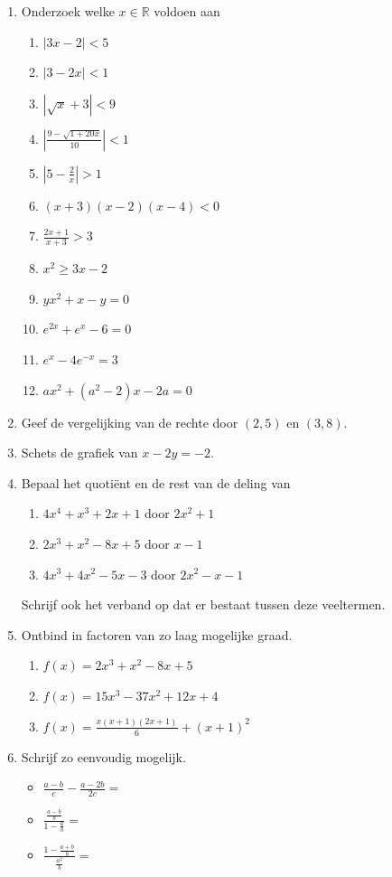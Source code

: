 \documentclass[11pt]{article}
\newcommand{\RR}{\ensuremath{\mathbb{R}}}
\newcommand{\ds}{\displaystyle}
\begin{document}
{\begin{enumerate}
\item
 Onderzoek welke $x\in \RR$ voldoen aan
 \begin{enumerate}
\item $\displaystyle |3x-2| < 5$
\item $|3-2x| < 1$
\item  $|\sqrt{x}+3|<9$
\item $\displaystyle \left|  \frac{9 - \sqrt{1+20x}}{10} \right| < 1$
\item  $\displaystyle \left|5-\frac{2}{x}\right|>1$
 
\item $(x+3)(x-2)(x-4) < 0$
\item $\ds \frac{2x+1}{x+3} > 3$
\item $\ds x^2  \geq 3x -2$
\item $y x^2 + x -y = 0$
\item $e^{2x} + e^x -6 = 0$
\item $e^x -4 e^{-x} = 3$
\item $a x^2 + (a^2 - 2) x -2 a = 0$

\end{enumerate}


\item Geef de vergelijking van de rechte door $(2,5)$ en $(3,8)$.
\item Schets de grafiek van $x-2y=-2$.

\item Bepaal het quoti\"ent en de rest van de deling van
\begin{enumerate}
\item $4x^4+x^3+2x+1$ door $2x^2+1$
\item $2 x^3 + x^2 - 8x + 5$ door $x-1$
\item $4x^3+4x^2-5x-3$ door $2x^2 -x -1$
\end{enumerate}
Schrijf ook het verband op dat er bestaat tussen deze veeltermen.
\item Ontbind in factoren van zo laag mogelijke graad.
\begin{enumerate}
\item $f(x) = 2 x^3 + x^2 - 8x + 5$
\item $f(x)=15x^3-37x^2+12x+4$
\item $\displaystyle f(x) = \frac{x(x+1)(2x+1)}{6} + (x+1)^2 $
\end{enumerate}

\item Schrijf zo eenvoudig mogelijk.
\begin{itemize}
\item $\ds{\frac{a-b}{c}-\frac{a-2b}{2c}=}$
\item $\ds{\frac{\frac{a-b}{b}}{1-\frac{a}{b}}=}$
\item $\ds{\frac{1-\frac{a+b}{b}}{\frac{a^{2}}{b}}=}$
\end{itemize}


\end{enumerate}}
\end{document}

